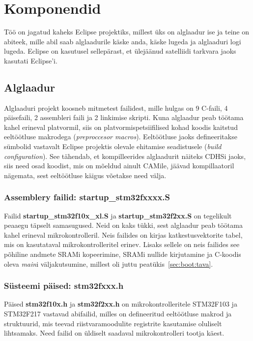 \documentclass[12pt,a4paper]{article}
\begin{document}
\section{Komponendid}
Töö on jagatud kaheks Eclipse projektiks, millest üks on alglaadur ise ja teine on
abiteek, mille abil saab alglaadurile käske anda, käske lugeda ja alglaaduri
logi lugeda. Eclipse on kasutusel sellepärast, et ülejäänud satelliidi tarkvara jaoks
kasutati Eclipse'i. 

\subsection{Alglaadur}
Alglaaduri projekt koosneb mitmetest failidest, mille hulgas on 9 C-faili, 4
päisefaili, 2 assembleri faili ja 2 linkimise skripti. Kuna alglaadur peab töötama kahel erineval
platvormil, siis on platvormispetsiifilised kohad koodis kaitstud eeltöötluse
makrodega (\textit{preproccesor macros}). Eeltöötluse jaoks defineeritakse
sümbolid vastavalt Eclipse projektis olevale ehitamise seadistusele
(\textit{build configuration}). See tähendab, et kompilleerides alglaadurit
näiteks CDHSi jaoks, siis need osad koodist, mis on mõeldud ainult CAMile,
jäävad kompillaatoril nägemata, sest eeltöötluse käigus võetakse need välja.

\subsubsection{Assemblery failid: \textbf{startup\_stm32fxxxx.S}}
Failid \textbf{startup\_stm32f10x\_xl.S} ja \textbf{startup\_stm32f2xx.S} on
tegelikult peaaegu täpselt samasugused. Neid on kaks tükki, sest alglaadur peab
töötama kahel erineval mikrokontrolleril. Neis failides on kirjas
katkestusvektorite tabel, mis on kasutataval mikrokontrolleritel erinev. Lisaks
sellele on neis failides see põhiline andmete SRAMi kopeerimine, SRAMi nullide
kirjutamine ja C-koodis oleva \textit{main}i väljakutsumine, millest oli juttu
peatükis~\ref{sec:boot:tava}.

\subsubsection{Süsteemi päised: \textbf{stm32fxxx.h}}
Päised \textbf{stm32f10x.h} ja \textbf{stm32f2xx.h} on mikrokontrolleritele
STM32F103 ja STM32F217 vastavad abifailid, milles on defineeritud eeltöötluse
makrod ja struktuurid, mis teevad riistvaramoodulite registrite kasutamise
oluliselt lihtsamaks. Need failid on üldiselt saadaval mikrokontrolleri tootja
käest.
\end{document}
